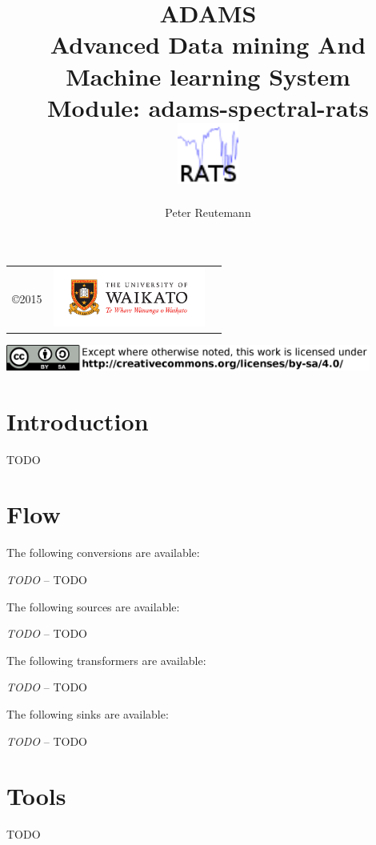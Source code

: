 \documentclass[a4paper]{book}
\title{
  \textbf{ADAMS} \\
  {\Large \textbf{A}dvanced \textbf{D}ata mining \textbf{A}nd \textbf{M}achine
  learning \textbf{S}ystem} \\
  {\Large Module: adams-spectral-rats} \\
  \vspace{1cm}
  \includegraphics[width=2cm]{images/spectral-rats-module.png} \\
}
\author{
  Peter Reutemann
}
\begin{document}
\begin{titlepage}
\maketitle

\thispagestyle{empty}
\center
\begin{table}[b]
	\begin{tabular}{c l l}
		\parbox[c][2cm]{2cm}{\copyright 2015} &
		\parbox[c][2cm]{5cm}{\includegraphics[width=5cm]{images/coat_of_arms.pdf}} \\
	\end{tabular}
	\includegraphics[width=12cm]{images/cc.png} \\
\end{table}

\end{titlepage}

\tableofcontents
\listoffigures

\chapter{Introduction}
TODO

\chapter{Flow}
The following conversions are available:
\begin{tight_itemize}
  	\item \textit{TODO} -- TODO
\end{tight_itemize}
The following sources are available:
\begin{tight_itemize}
  	\item \textit{TODO} -- TODO
\end{tight_itemize}
The following transformers are available:
\begin{tight_itemize}
  	\item \textit{TODO} -- TODO
\end{tight_itemize}
The following sinks are available:
\begin{tight_itemize}
  	\item \textit{TODO} -- TODO
\end{tight_itemize}

\chapter{Tools}
TODO


\end{document}
